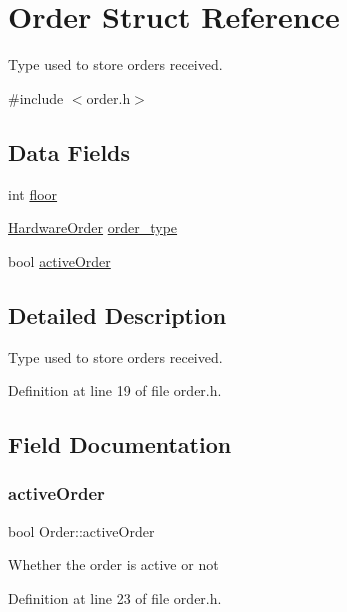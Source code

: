 \hypertarget{structOrder}{}\section{Order Struct Reference}
\label{structOrder}


Type used to store orders received.  




{\ttfamily \#include $<$order.\+h$>$}

\subsection*{Data Fields}
\begin{DoxyCompactItemize}
\item 
int \hyperlink{structOrder_a5243dc659272f25ee0b39a569b9bbd43}{floor}
\item 
\hyperlink{hardware_8h_a796a8de8ce0ae769d7dbd3327a7bdbe7}{Hardware\+Order} \hyperlink{structOrder_aeddebdba3b07c66358921945e8710825}{order\+\_\+type}
\item 
bool \hyperlink{structOrder_aae4aace115b71ddc643d0d88d025516f}{active\+Order}
\end{DoxyCompactItemize}


\subsection{Detailed Description}
Type used to store orders received. 

Definition at line 19 of file order.\+h.



\subsection{Field Documentation}
\mbox{\label{structOrder_aae4aace115b71ddc643d0d88d025516f}} 
\subsubsection{\texorpdfstring{active\+Order}{activeOrder}}
{\footnotesize\ttfamily bool Order\+::active\+Order}

Whether the order is active or not 

Definition at line 23 of file order.\+h.

\mbox{\label{structOrder_a5243dc659272f25ee0b39a569b9bbd43}} 
